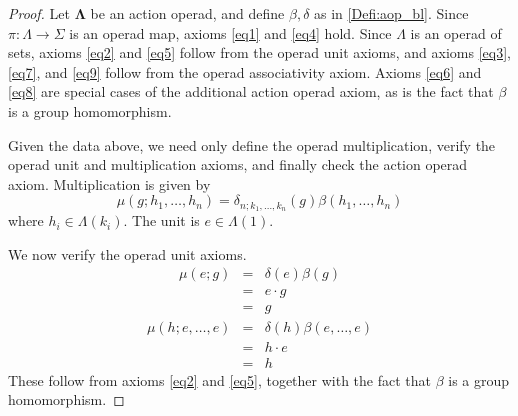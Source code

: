 \documentclass{amsbook} %
\newcommand{\mb}{\mathbf}
\numberwithin{section}{chapter}
\begin{document}
\begin{proof}
Let $\mb{\Lambda}$ be an action operad, and define $\beta, \delta$ as in \cref{Defi:aop_bl}.  Since $\pi:\Lambda \rightarrow \Sigma$ is an operad map, axioms \eqref{eq1} and \eqref{eq4} hold.  Since $\Lambda$ is an operad of sets, axioms \eqref{eq2} and \eqref{eq5} follow from the operad unit axioms, and axioms \eqref{eq3}, \eqref{eq7}, and \eqref{eq9} follow from the operad associativity axiom.  Axioms \eqref{eq6} and \eqref{eq8} are special cases of the additional action operad axiom, as is the fact that $\beta$ is a group homomorphism.

Given the data above, we need only define the operad multiplication, verify the operad unit and multiplication axioms,  and finally check the action operad axiom.  Multiplication is given by
\[
\mu(g; h_{1}, \ldots, h_{n}) = \delta_{n; k_{1}, \ldots, k_{n}}(g) \beta(h_{1}, \ldots, h_{n})
\]
where $h_{i} \in \Lambda(k_{i})$.  The unit is $e \in \Lambda(1)$.

We now verify the operad unit axioms.
\[
\begin{array}{rcl}
\mu(e; g) & = & \delta(e)\beta(g) \\
& = & e \cdot g \\
& = & g
\end{array}
\]
\[
\begin{array}{rcl}
\mu(h; e, \ldots, e) & = & \delta(h)\beta(e, \ldots, e) \\
& = & h \cdot e \\
& = & h
\end{array}
\]
These follow from axioms \eqref{eq2} and \eqref{eq5}, together with the fact that $\beta$ is a group homomorphism.


\end{proof}
\end{document}
